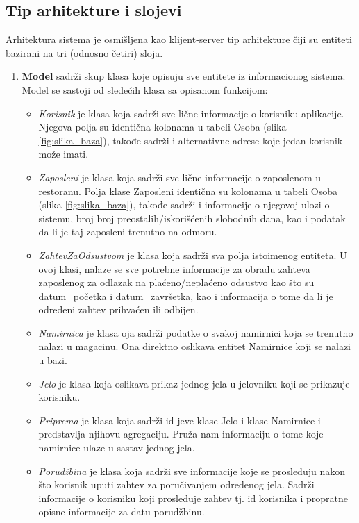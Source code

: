 \subsection{Tip arhitekture i slojevi}
Arhitektura sistema je osmišljena kao klijent-server tip arhitekture čiji su entiteti bazirani na tri (odnosno četiri) sloja.
\begin{enumerate}
    \item \textbf{Model} sadrži skup klasa koje opisuju sve entitete iz informacionog sistema. Model se sastoji od sledećih klasa sa opisanom funkcijom:
    \begin{itemize}
        \item \emph{Korisnik} je klasa koja sadrži sve lične informacije o korisniku aplikacije. Njegova polja su identična kolonama u tabeli Osoba (slika \ref{fig:slika_baza}), takođe sadrži i alternativne adrese koje jedan korisnik može imati.
        \item \emph{Zaposleni} je klasa koja sadrži sve lične informacije o zaposlenom u restoranu. Polja klase Zaposleni identična su kolonama u tabeli Osoba (slika \ref{fig:slika_baza}), takođe sadrži i informacije o njegovoj ulozi o sistemu, broj broj preostalih/iskorišćenih slobodnih dana, kao i podatak da li je taj zaposleni trenutno na odmoru.
        \item \emph{ZahtevZaOdsustvom} je klasa koja sadrži sva polja istoimenog entiteta. U ovoj klasi, nalaze se sve potrebne informacije za obradu zahteva zaposlenog za odlazak na plaćeno/neplaćeno odsustvo kao što su datum\_početka i datum\_završetka, kao i informacija o tome da li je određeni zahtev prihvaćen ili odbijen.
        \item \emph{Namirnica} je klasa oja sadrži podatke o svakoj namirnici koja se trenutno nalazi u magacinu. Ona direktno oslikava entitet Namirnice koji se nalazi u bazi.
         \item \emph{Jelo} je klasa koja oslikava prikaz jednog jela u jelovniku koji se prikazuje korisniku.
         \item \emph {Priprema} je klasa koja sadrži id-jeve klase Jelo i klase Namirnice i predstavlja njihovu agregaciju. Pruža nam informaciju o tome koje namirnice ulaze u sastav jednog jela.
         \item \emph{Porudžbina} je klasa koja sadrži sve informacije koje se prosleđuju nakon što korisnik uputi zahtev za poručivanjem određenog jela. Sadrži informacije o korisniku koji prosleđuje zahtev tj. id korisnika i propratne opisne informacije za datu porudžbinu.

\end{itemize}
\end{enumerate}

